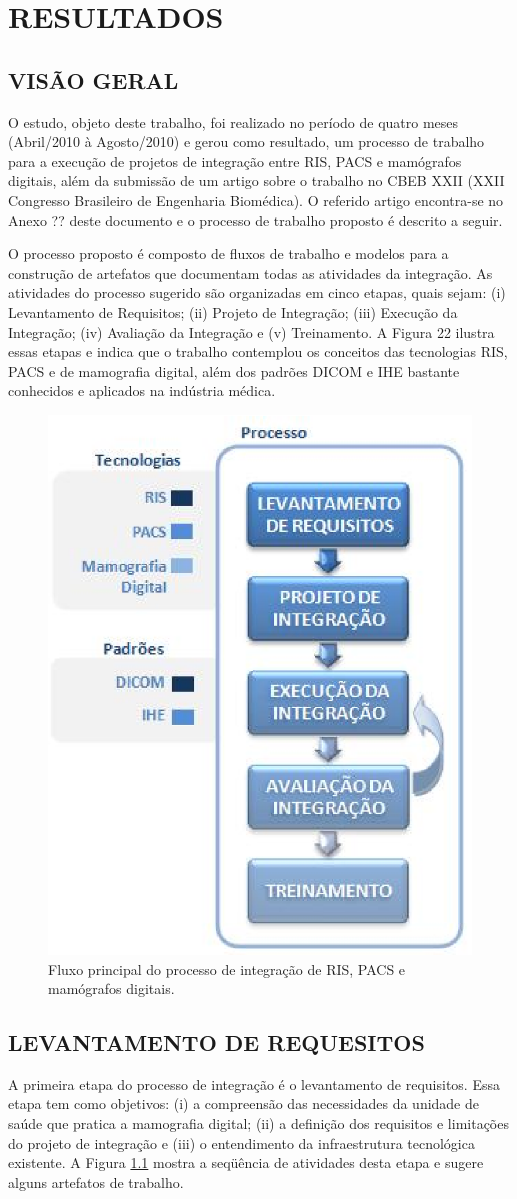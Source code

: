 \chapter[RESULTADOS]{\textbf {RESULTADOS}}

\section[VISÃO GERAL]{VISÃO GERAL}
O estudo, objeto deste trabalho, foi realizado no período de quatro meses (Abril/2010 à
Agosto/2010) e gerou como resultado, um processo de trabalho para a execução de
projetos de integração entre RIS, PACS e mamógrafos digitais, além da submissão de um
artigo sobre o trabalho no CBEB XXII (XXII Congresso Brasileiro de Engenharia
Biomédica). O referido artigo encontra-se no Anexo ?? deste documento e o processo de
trabalho proposto é descrito a seguir.

O processo proposto é composto de fluxos de trabalho e modelos para a construção de
artefatos que documentam todas as atividades da integração. As atividades do processo
sugerido são organizadas em cinco etapas, quais sejam: (i) Levantamento de Requisitos;
(ii) Projeto de Integração; (iii) Execução da Integração; (iv) Avaliação da Integração e (v)
Treinamento. A Figura 22 ilustra essas etapas e indica que o trabalho contemplou os
conceitos das tecnologias RIS, PACS e de mamografia digital, além dos padrões DICOM e
IHE bastante conhecidos e aplicados na indústria médica.


\begin{figure}[ht]
 \centering
 \includegraphics[width=6 cm]{figuras/fig2.eps}
 \caption{Fluxo principal do processo de integração de RIS, PACS e mamógrafos digitais.}
 \label{fig2}
\end{figure}


\section[LEVANTAMENTO DE REQUESITOS]{LEVANTAMENTO DE REQUESITOS}


A primeira etapa do processo de integração é o levantamento de requisitos. Essa etapa tem
como objetivos: (i) a compreensão das necessidades da unidade de saúde que pratica a
mamografia digital; (ii) a definição dos requisitos e limitações do projeto de integração e
(iii) o entendimento da infraestrutura tecnológica existente. A Figura \ref{fig2} mostra a
seqüência de atividades desta etapa e sugere alguns artefatos de trabalho.


